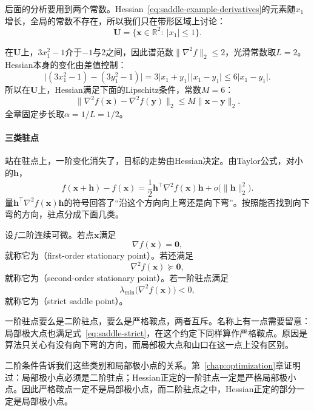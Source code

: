 后面的分析要用到两个常数。Hessian~\eqref{eq:saddle-example-derivatives}的元素随$x_1$增长，全局的常数不存在，所以我们只在带形区域上讨论：
\[
 \bm{U}=\bigl\{\bm{x}\in\mathbb{R}^2:\ \lvert x_1\rvert\leq1\bigr\}.
\]

在$\bm{U}$上，$3x_1^2-1$介于$-1$与$2$之间，因此谱范数$\lVert\nabla^2f\rVert_2\leq2$，光滑常数取$L=2$。Hessian本身的变化由差值控制：
\[
 \bigl\lvert(3x_1^2-1)-(3y_1^2-1)\bigr\rvert
 =3\lvert x_1+y_1\rvert\,\lvert x_1-y_1\rvert
 \leq6\lvert x_1-y_1\rvert.
\]
所以在$\bm{U}$上，Hessian满足下面的Lipschitz条件，常数$M=6$：
\[
 \bigl\lVert\nabla^2f(\bm{x})-\nabla^2f(\bm{y})\bigr\rVert_2\leq M\lVert\bm{x}-\bm{y}\rVert_2.
\]
全章固定步长取$\alpha=1/L=1/2$。

\paragraph{三类驻点}
站在驻点上，一阶变化消失了，目标的走势由Hessian决定。由Taylor公式，对小的$\bm{h}$，
\[
 f(\bm{x}+\bm{h})-f(\bm{x})=\frac12\bm{h}^\top\nabla^2f(\bm{x})\bm{h}+o\bigl(\lVert\bm{h}\rVert_2^2\bigr).
\]
量$\bm{h}^\top\nabla^2f(\bm{x})\bm{h}$的符号回答了“沿这个方向向上弯还是向下弯”。按照能否找到向下弯的方向，驻点分成下面几类。

\begin{definition}[驻点的类型]
 \label{def:saddle-stationary}
 设$f$二阶连续可微。若点$\bm{x}$满足
 \begin{equation}
  \nabla f(\bm{x})=\bm{0},
  \label{eq:saddle-first-order}
 \end{equation}
 就称它为（first-order stationary point）。若还满足
 \begin{equation}
  \nabla^2f(\bm{x})\succeq\bm{0},
  \label{eq:saddle-second-order}
 \end{equation}
 就称它为（second-order stationary point）。若一阶驻点满足
 \begin{equation}
  \lambda_{\min}\bigl(\nabla^2f(\bm{x})\bigr)<0,
  \label{eq:saddle-strict}
 \end{equation}
 就称它为（strict saddle point）。
\end{definition}

一阶驻点要么是二阶驻点，要么是严格鞍点，两者互斥。名称上有一点需要留意：局部极大点也满足式~\eqref{eq:saddle-strict}，在这个约定下同样算作严格鞍点。原因是算法只关心有没有向下弯的方向，而局部极大点和山口在这一点上没有区别。

二阶条件告诉我们这些类别和局部极小点的关系。第~\ref{chap:optimization}章证明过：局部极小点必须是二阶驻点；Hessian正定的一阶驻点一定是严格局部极小点。因此严格鞍点一定不是局部极小点，而二阶驻点之中，Hessian正定的部分一定是局部极小点。

